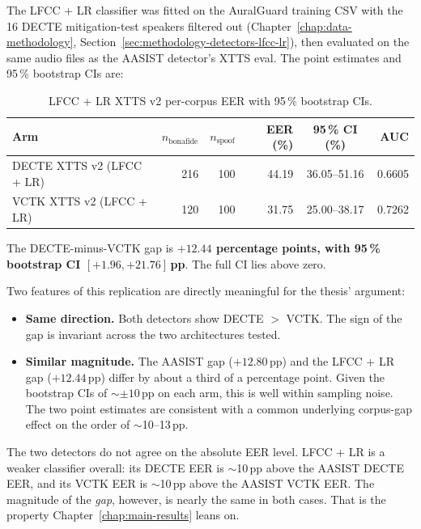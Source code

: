 The LFCC + LR classifier was fitted on the AuralGuard training CSV
with the 16 DECTE mitigation-test speakers filtered out
(Chapter~\ref{chap:data-methodology}, Section~\ref{sec:methodology-detectors-lfcc-lr}), then evaluated on the same audio files
as the AASIST detector's XTTS eval. The point estimates and
95\,\% bootstrap CIs are:

\begin{table}[t]
\centering
\caption{LFCC + LR XTTS v2 per-corpus EER with 95\,\% bootstrap CIs.}
\label{tab:main-results-lfcc-xtts}
\begin{tabularx}{\linewidth}{X r r r c r}
\toprule
\textbf{Arm} & \textbf{$n_\text{bonafide}$} & \textbf{$n_\text{spoof}$} & \textbf{EER (\%)} & \textbf{95\,\% CI (\%)} & \textbf{AUC} \\
\midrule
DECTE XTTS v2 (LFCC + LR) & 216 & 100 & 44.19 & 36.05--51.16 & 0.6605 \\
VCTK XTTS v2 (LFCC + LR)  & 120 & 100 & 31.75 & 25.00--38.17 & 0.7262 \\
\bottomrule
\end{tabularx}
\end{table}

The DECTE-minus-VCTK gap is \textbf{$+12.44$ percentage points,
with 95\,\% bootstrap CI $[+1.96, +21.76]$\,pp}. The full CI lies
above zero.

Two features of this replication are directly meaningful for the
thesis' argument:

\begin{itemize}
    \item \textbf{Same direction.} Both detectors show DECTE $>$ VCTK. The sign
        of the gap is invariant across the two architectures tested.
    \item \textbf{Similar magnitude.} The AASIST gap ($+12.80$\,pp) and the
        LFCC + LR gap ($+12.44$\,pp) differ by about a third of a
        percentage point. Given the bootstrap CIs of $\sim$$\pm 10$\,pp on each
        arm, this is well within sampling noise. The two point
        estimates are consistent with a common underlying corpus-gap
        effect on the order of $\sim$10--13\,pp.
\end{itemize}

The two detectors do not agree on the absolute EER level. LFCC + LR
is a weaker classifier overall: its DECTE EER is $\sim$10\,pp above
the AASIST DECTE EER, and its VCTK EER is $\sim$10\,pp above the
AASIST VCTK EER. The magnitude of the \emph{gap}, however, is
nearly the same in both cases. That is the property Chapter~\ref{chap:main-results}
leans on.


